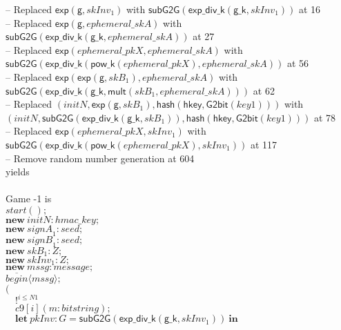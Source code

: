 \documentclass{article}
\newcommand{\cinput}[2]{{#1}({#2})}
\newcommand{\coutput}[2]{\overline{#1}\langle{#2}\rangle}
\newcommand{\kw}[1]{\mathbf{#1}}
\newcommand{\kwf}[1]{\mathsf{#1}}
\newcommand{\var}[1]{\mathit{#1}}
\newcommand{\kwt}[1]{\mathit{#1}}
\newcommand{\kwp}[1]{\mathit{#1}}
\newcommand{\kwc}[1]{\mathit{#1}}
\begin{document}
\begin{tabbing}
\qquad -- Replaced $\kwf{exp}(\kwf{g}, \var{skInv}_{1})$ with $\kwf{subG2G}(\kwf{exp{\_}div{\_}k}(\kwf{g{\_}k}, \var{skInv}_{1}))$ at 16\\
\qquad -- Replaced $\kwf{exp}(\kwf{g}, \var{ephemeral{\_}skA})$ with $\kwf{subG2G}(\kwf{exp{\_}div{\_}k}(\kwf{g{\_}k}, \var{ephemeral{\_}skA}))$ at 27\\
\qquad -- Replaced $\kwf{exp}(\var{ephemeral{\_}pkX}, \var{ephemeral{\_}skA})$ with $\kwf{subG2G}(\kwf{exp{\_}div{\_}k}(\kwf{pow{\_}k}(\var{ephemeral{\_}pkX}), \var{ephemeral{\_}skA}))$ at 56\\
\qquad -- Replaced $\kwf{exp}(\kwf{exp}(\kwf{g}, \var{skB}_{1}), \var{ephemeral{\_}skA})$ with $\kwf{subG2G}(\kwf{exp{\_}div{\_}k}(\kwf{g{\_}k}, \kwf{mult}(\var{skB}_{1}, \var{ephemeral{\_}skA})))$ at 62\\
\qquad -- Replaced $\kwf{}(\var{initN}, \kwf{exp}(\kwf{g}, \var{skB}_{1}), \kwf{hash}(\kwf{hkey}, \kwf{G2bit}(\var{key1})))$ with $\kwf{}(\var{initN}, \kwf{subG2G}(\kwf{exp{\_}div{\_}k}(\kwf{g{\_}k}, \var{skB}_{1})), \kwf{hash}(\kwf{hkey}, \kwf{G2bit}(\var{key1})))$ at 78\\
\qquad -- Replaced $\kwf{exp}(\var{ephemeral{\_}pkX}, \var{skInv}_{1})$ with $\kwf{subG2G}(\kwf{exp{\_}div{\_}k}(\kwf{pow{\_}k}(\var{ephemeral{\_}pkX}), \var{skInv}_{1}))$ at 117\\
\qquad -- Remove random number generation at 604\\
yields\\
\\
Game -1 is\\
\>$\cinput{\kwc{start}}{};$\\
\>$\kw{new}\ \var{initN}: \kwt{hmac{\_}key};$\\
\>$\kw{new}\ \var{signA}_{1}: \kwt{seed};$\\
\>$\kw{new}\ \var{signB}_{1}: \kwt{seed};$\\
\>$\kw{new}\ \var{skB}_{1}: \kwt{Z};$\\
\>$\kw{new}\ \var{skInv}_{1}: \kwt{Z};$\\
\>$\kw{new}\ \var{mssg}: \kwt{message};$\\
\>$\coutput{\kwc{begin}}{\var{mssg}};$\\
\>$($\\
\>$\quad !^{\var{i} \leq \kwp{N1}}$\\
\>$\quad \cinput{\kwc{c9}[\var{i}]}{\var{m}: \kwt{bitstring}};$\\
\>$\quad \kw{let}\ \var{pkInv}: \kwt{G} = \kwf{subG2G}(\kwf{exp{\_}div{\_}k}(\kwf{g{\_}k}, \var{skInv}_{1}))\ \kw{in}$\\

\end{tabbing}
\end{document}
